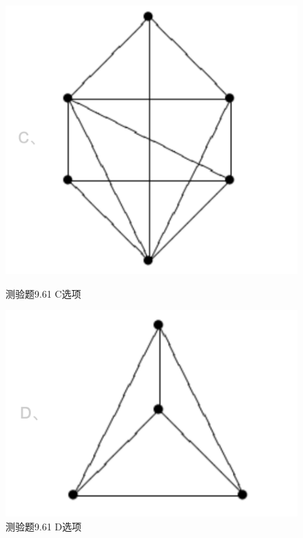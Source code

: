 \documentclass[UTF8, heading=true]{ctexart}
\begin{document}
\begin{figure}[htbp]
    \centering
    \begin{minipage}[t]{0.35\textwidth}
        \centering
        \includegraphics[width=1\textwidth]{9.61_3.png} %
	      \vspace{-0.3cm}
        \caption{测验题9.61 C选项}
    \end{minipage}
	  \hspace{0.1\textwidth} %
    \begin{minipage}[t]{0.35\textwidth}
        \centering
        \includegraphics[width=1\textwidth]{9.61_4.png} %
	      \vspace{-0.3cm}
        \caption{测验题9.61 D选项}
\end{minipage}
\end{figure}
\end{document}
